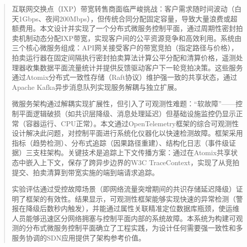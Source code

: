 

\begin{abstract}
  互联网交换点（IXP）带宽转售商面临严峻挑战：客户需求随时间波动（白天1Gbps、夜间200Mbps），但传统合同分配固定容量，导致大量浪费或超额费用。本文设计并实现了一个分布式微服务控制平面，通过周期性密封拍卖机制动态分配IXP带宽，实现客户间的公平资源竞争和高效利用。系统由三个核心微服务组成：API网关接受客户的带宽竞拍（指定路径与价格），拍卖运行器在固定间隔执行密封拍卖算法计算公平分配和清算价格，遥测处理器收集数据平面流量统计并提供反馈驱动客户下一轮竞拍决策。这些服务通过Atomix分布式一致性存储（Raft协议）维护强一致的共享状态，通过Apache Kafka异步消息队列实现服务解耦与独立扩展。

  微服务架构通过解耦实现扩展性，但引入了可观测性难题：“软故障”——控制平面逻辑破损（如共识层降级、消息处理延迟）但基础设施监控仍显示正常（容器运行、CPU正常）。本文通过OpenTelemetry框架的综合可观测性设计解决此问题，对控制平面进行系统化仪器化以快速检测故障。框架采用指标（趋势检测）、分布式追踪（因果路径重建）、结构化日志（事件级证据）三支柱架构。关键技术是追踪上下文传播方案：通过在Atomix共享状态中嵌入上下文，保存了跨异步边界的W3C TraceContext，实现了从竞拍提交、拍卖清算到带宽实施的端到端请求追踪。

  实验评估通过受控故障场景（即网络流量突增期间的共识存储延迟降级）证明了框架的有效性。结果显示，可观测性框架能够实现快速的异常检测（警报在降级后数秒内触发），并能通过属性关联精准定位数据库瓶颈，使运维人员能够迅速区分网络拥塞与控制平面内部的系统故障。本系统为构建可观测的分布式微服务控制平面确立了工程实践，为设计任何需要强一致性和多服务协调的SDN应用提供了架构参考价值。
\end{abstract}

